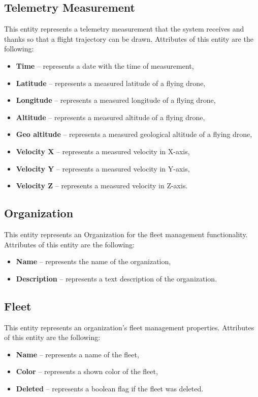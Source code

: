 \subsection{Telemetry Measurement}\label{subsec:telemetry-measurement}
This entity represents a telemetry measurement that the system receives and thanks so that a flight trajectory can be drawn.
Attributes of this entity are the following:
\begin{itemize}
    \item \textbf{Time} -- represents a date with the time of measurement,
    \item \textbf{Latitude} -- represents a measured latitude of a flying drone,
    \item \textbf{Longitude} -- represents a measured longitude of a flying drone,
    \item \textbf{Altitude} -- represents a measured altitude of a flying drone,
    \item \textbf{Geo altitude} -- represents a measured geological altitude of a flying drone,
    \item \textbf{Velocity X} -- represents a measured velocity in X-axis,
    \item \textbf{Velocity Y} -- represents a measured velocity in Y-axis,
    \item \textbf{Velocity Z} -- represents a measured velocity in Z-axis.
\end{itemize}

\subsection{Organization}\label{subsec:organization}
This entity represents an Organization for the fleet management functionality.
Attributes of this entity are the following:
\begin{itemize}
    \item \textbf{Name} -- represents the name of the organization,
    \item \textbf{Description} -- represents a text description of the organization.
\end{itemize}

\subsection{Fleet}\label{subsec:fleet}
This entity represents an organization's fleet management properties.
Attributes of this entity are the following:
\begin{itemize}
    \item \textbf{Name} -- represents a name of the fleet,
    \item \textbf{Color} -- represents a shown color of the fleet,
    \item \textbf{Deleted} -- represents a boolean flag if the fleet was deleted.
\end{itemize}

